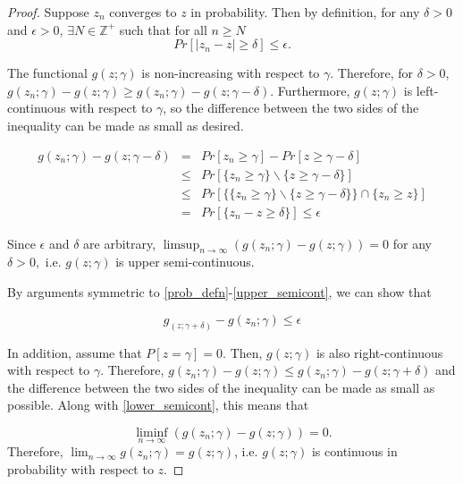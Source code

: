 \documentclass[12pt]{article} %
\begin{document}
\begin{proof}
Suppose $z_n$ converges to $z$ in probability. Then by definition, for any  $\delta>0$ and  $\epsilon>0$, $\exists	N\in\mathbb{Z^+}$ such that for all   $n \geq N$ 
$$ Pr\left[\left|z_n-z\right| \geq \delta \right] \leq \epsilon.$$

 The functional  $g(z;\gamma)$ is  non-increasing with respect to $\gamma$. Therefore, for $\delta>0$, 
$g(z_n;\gamma) -g(z;\gamma) \geq g(z_n;\gamma) -g(z;\gamma-\delta) $. Furthermore, $g(z;\gamma)$ is left-continuous with respect to $\gamma$, so the difference between the two sides of the inequality can be made as small as desired.

\begin{eqnarray}
g(z_n;\gamma) - g(z;\gamma-\delta) & = &Pr\left[z_n\geq \gamma \right] -Pr\left[z \geq  \gamma - \delta \right] \label{prob_defn}\\
& \leq &  Pr\left[\{z_n \geq \gamma \} \backslash \{z \geq \gamma - \delta \} \right] \label{set_diff}\\
& \leq & Pr\left[\{\{z_n \geq \gamma \} \backslash \{z \geq \gamma - \delta \} \} \cap \{z_n \geq  z\} \right] \label{conjunct_with_set} \\
& =  & Pr\left[\{z_n - z \geq \delta \} \right] \leq \epsilon \label{upper_semicont}
\end{eqnarray}
 
Since $\epsilon$ and $\delta$ are arbitrary,
 $ \limsup_{n \rightarrow \infty} ( {g(z_n;\gamma)}- g(z;\gamma) ) =  0$ for any $\delta>0, $ i.e. $g(z;\gamma)$ is upper semi-continuous.

By arguments  symmetric to  \eqref{prob_defn}-\eqref{upper_semicont}, we can show that

\begin{equation}
g_(z;\gamma+\delta) - g(z_n;\gamma) \leq \epsilon \label{lower_semicont}
\end{equation}


In addition, assume that  $P\left[z = \gamma \right]=0$. Then, $g(z;\gamma)$ is also right-continuous with respect to $\gamma$. Therefore, 
$g(z_n;\gamma) -g(z;\gamma) \leq g(z_n;\gamma) -g(z;\gamma+\delta)$ and the difference between the two sides of the inequality can be made as small as possible. Along with \ref{lower_semicont}, this means that

 \[ 
\liminf_{n \rightarrow \infty} ( {g(z_n;\gamma)}- g(z;\gamma) ) = 0. 
\] Therefore, $\lim_{n\rightarrow \infty}g(z_n;\gamma) = g(z;\gamma)$, i.e. $g(z;\gamma)$ is continuous in probability with respect to $z$.
\end{proof}
\end{document}
